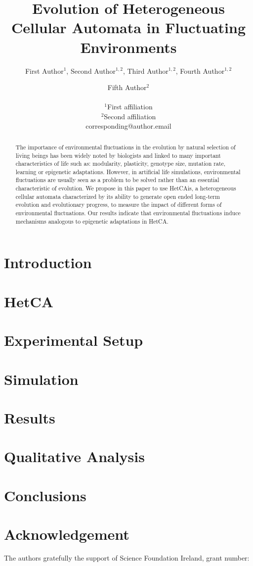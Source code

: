 \documentclass[letterpaper]{article}
\title{Evolution of Heterogeneous Cellular Automata in Fluctuating Environments}
\author{First Author$^{1}$, Second Author$^{1,2}$, Third Author$^{1,2}$, Fourth Author$^{1,2}$ \and Fifth Author$^2$ \\
\mbox{}\\
$^1$First affiliation  \\
$^2$Second affiliation \\
corresponding@author.email}
\begin{document}
\maketitle

\begin{abstract}
The importance of environmental fluctuations in the evolution by natural selection of living beings has been widely noted by biologists and linked to many important characteristics of life such as: modularity, plasticity, genotype size, mutation rate, learning or epigenetic adaptations. However, in artificial life simulations, environmental fluctuations are usually seen as a problem to be solved rather than an essential characteristic of evolution. We propose in this paper to use HetCAis, a heterogeneous cellular automata characterized by its ability to generate open ended long-term evolution and evolutionary progress, to measure the impact of different forms of environmental fluctuations. Our results indicate that environmental fluctuations induce mechanisms analogous to epigenetic adaptations in HetCA.
\end{abstract}



\section{Introduction}\label{sec:intro}


%

\section{HetCA}\label{sec:hetca)}


\section{Experimental Setup}\label{sec:exsetup}


\section{Simulation}\label{sec:method}



\section{Results}\label{sec:method}




\section{Qualitative Analysis}



\section{Conclusions}\label{sec:conc}


\section{Acknowledgement}
The authors gratefully the support of Science Foundation Ireland, grant number:


\end{document}
